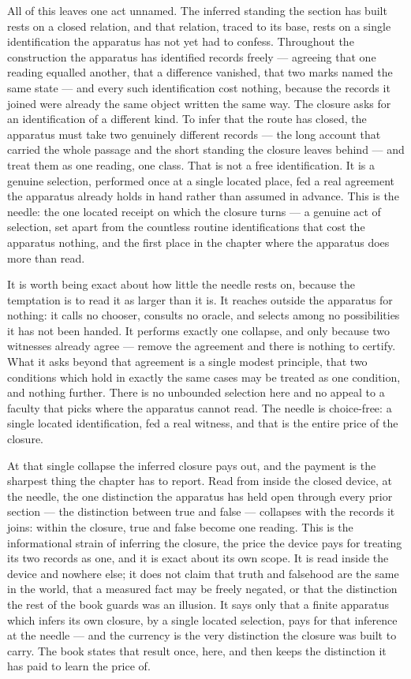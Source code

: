 All of this leaves one act unnamed. The inferred standing the section has built rests on a closed relation, and that relation, traced to its base, rests on a single identification the apparatus has not yet had to confess. Throughout the construction the apparatus has identified records freely --- agreeing that one reading equalled another, that a difference vanished, that two marks named the same state --- and every such identification cost nothing, because the records it joined were already the same object written the same way. The closure asks for an identification of a different kind. To infer that the route has closed, the apparatus must take two genuinely different records --- the long account that carried the whole passage and the short standing the closure leaves behind --- and treat them as one reading, one class. That is not a free identification. It is a genuine selection, performed once at a single located place, fed a real agreement the apparatus already holds in hand rather than assumed in advance. This is the needle: the one located receipt on which the closure turns --- a genuine act of selection, set apart from the countless routine identifications that cost the apparatus nothing, and the first place in the chapter where the apparatus does more than read.

It is worth being exact about how little the needle rests on, because the temptation is to read it as larger than it is. It reaches outside the apparatus for nothing: it calls no chooser, consults no oracle, and selects among no possibilities it has not been handed. It performs exactly one collapse, and only because two witnesses already agree --- remove the agreement and there is nothing to certify. What it asks beyond that agreement is a single modest principle, that two conditions which hold in exactly the same cases may be treated as one condition, and nothing further. There is no unbounded selection here and no appeal to a faculty that picks where the apparatus cannot read. The needle is choice-free: a single located identification, fed a real witness, and that is the entire price of the closure.

At that single collapse the inferred closure pays out, and the payment is the sharpest thing the chapter has to report. Read from inside the closed device, at the needle, the one distinction the apparatus has held open through every prior section --- the distinction between true and false --- collapses with the records it joins: within the closure, true and false become one reading. This is the informational strain of inferring the closure, the price the device pays for treating its two records as one, and it is exact about its own scope. It is read inside the device and nowhere else; it does not claim that truth and falsehood are the same in the world, that a measured fact may be freely negated, or that the distinction the rest of the book guards was an illusion. It says only that a finite apparatus which infers its own closure, by a single located selection, pays for that inference at the needle --- and the currency is the very distinction the closure was built to carry. The book states that result once, here, and then keeps the distinction it has paid to learn the price of.

